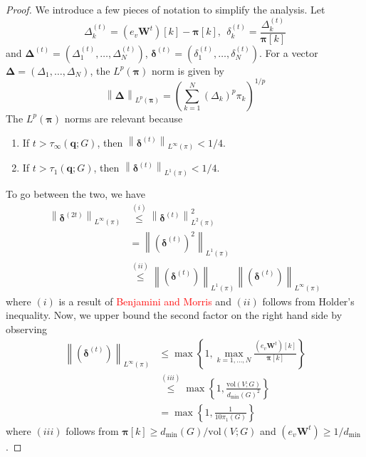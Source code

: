 \documentclass{article}
\newcommand{\vol}{\mathrm{vol}}
\newcommand{\norm}[1]{\left\lVert#1\right\rVert}
\newcommand{\1}{\mathbf{1}}
\newcommand{\qbf}{\mathbf{q}}
\newcommand{\pibf}{\bm{\pi}}
\newcommand{\Deltabf}{\bm{\Delta}}
\newcommand{\deltabf}{\bm{\delta}}
\newcommand{\Wbf}{\mathbf{W}}
\theoremstyle{aldenthm}
\begin{document}
\begin{proof}
	We introduce a few pieces of notation to simplify the analysis. Let
	\begin{equation*}
	\Delta_k^{(t)} = (e_v\Wbf^t)[k] - \pibf[k], ~~ \delta_k^{(t)} = \frac{\Delta_k^{(t)}}{\pibf[k]}
	\end{equation*}
	and $\Deltabf^{(t)} = (\Delta_1^{(t)}, \ldots, \Delta_N^{(t)})$, $\deltabf^{(t)} = (\delta_1^{(t)}, \ldots, \delta_N^{(t)})$. For a vector $\Deltabf = (\Delta_1, \ldots, \Delta_{N})$, the $L^{p}(\pibf)$ norm is given by
	\begin{equation*}
	\norm{\Deltabf}_{L^p(\pibf)} = \left(\sum_{k = 1}^{N} \left(\Delta_k\right)^{p} \pi_k \right)^{1/p}
	\end{equation*}
	The $L^{p}(\pibf)$ norms are relevant because
	\begin{enumerate}
		\item If $t > \tau_{\infty}(\qbf; G)$, then $\norm{\deltabf^{(t)}}_{L^{\infty}(\pi)} < 1/4$. 
		\item If $t > \tau_{1}(\qbf; G)$, then 
		$\norm{\deltabf^{(t)}}_{L^{1}(\pi)} < 1/4$.
	\end{enumerate}
	
	To go between the two, we have
	\begin{align*}
	\norm{\deltabf^{(2t)}}_{L^{\infty}(\pi)} & \overset{(i)}{\leq} \norm{\deltabf^{(t)}}^2_{L^{2}(\pi)} \\
	& = \norm{(\deltabf^{(t)})^2}_{L^{1}(\pi)} \\
	& \overset{(ii)}{\leq}  \norm{(\deltabf^{(t)})}_{L^{1}(\pi)} \norm{(\deltabf^{(t)})}_{L^{\infty}(\pi)}
	\end{align*}
	where $(i)$ is a result of \textcolor{red}{Benjamini and Morris} and $(ii)$ follows from Holder's inequality. Now, we upper bound the second factor on the right hand side by observing
	\begin{align*}
	\norm{(\deltabf^{(t)})}_{L^{\infty}(\pi)} & \leq \max\left\{1, \max_{k  = 1,\ldots,N} \frac{(e_v\Wbf^t)[k]}{\pibf[k]} \right\} \\
	& \overset{(iii)}{\leq} \max\left\{1, \frac{\vol(V; G)}{d_{\min}(G)^2} \right\} \\
	& = \max\left\{1, \frac{1}{10 \pi_1(G)}\right\}
	\end{align*}
	where $(iii)$ follows from $\pibf[k] \geq d_{\min}(G) / \vol(V; G)$ and $(e_v\Wbf^t) \geq 1/d_{\min}$.
	

\end{proof}
\end{document}
